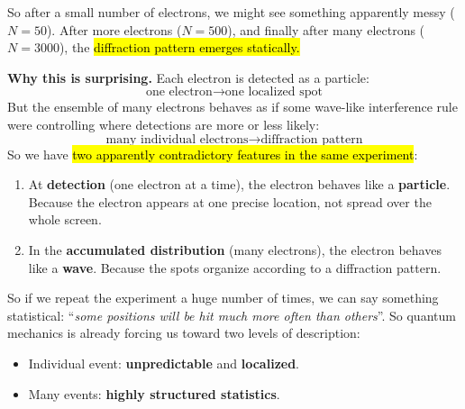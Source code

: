 \noindent
So after a small number of electrons, we might see something apparently messy ($N=50$). After more electrons ($N=500$), and finally after many electrons ($N=3000$), the \hl{diffraction pattern emerges statically.}

\highspace
\textcolor{Green3}{ \textbf{Why this is surprising.}} Each electron is detected as a particle:
\begin{equation*}
    \text{one electron} \rightarrow \text{one localized spot}
\end{equation*}
But the ensemble of many electrons behaves as if some wave-like interference rule were controlling where detections are more or less likely:
\begin{equation*}
    \text{many individual electrons} \rightarrow \text{diffraction pattern}
\end{equation*}
So we have \hl{two apparently contradictory features in the same experiment}:
\begin{enumerate}
    \item At \textbf{detection} (one electron at a time), the electron behaves like a \textbf{particle}. Because the electron appears at one precise location, not spread over the whole screen.

    \item In the \textbf{accumulated distribution} (many electrons), the electron behaves like a \textbf{wave}. Because the spots organize according to a diffraction pattern.
\end{enumerate}
So if we repeat the experiment a huge number of times, we can say something statistical: ``\emph{some positions will be hit much more often than others}''. So quantum mechanics is already forcing us toward two levels of description:
\begin{itemize}
    \item[\textcolor{Green3}{\faIcon{dice}}] Individual event: \textbf{unpredictable} and \textbf{localized}.
    \item[\textcolor{Green3}{\faIcon{chart-bar}}] Many events: \textbf{highly structured statistics}.
\end{itemize}

